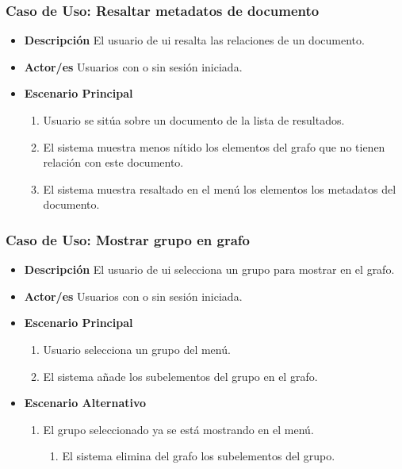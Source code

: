 \subsubsection{Caso de Uso: Resaltar \glspl{metadato} de documento}
\begin{itemize}
	\item{\textbf{Descripción}} El usuario de \gls{ui} resalta las relaciones de un documento.
    \item{\textbf{Actor/es}} Usuarios con o sin sesión iniciada.
    \item{\textbf{Escenario Principal}}
    	\begin{enumerate}
        	\item Usuario se sitúa sobre un documento de la lista de resultados.
			\item El sistema muestra menos nítido los elementos del grafo que no tienen relación con este documento.
            \item El sistema muestra resaltado en el menú los elementos los \glspl{metadato} del documento.
        \end{enumerate}
\end{itemize}


\subsubsection{Caso de Uso: Mostrar grupo en grafo}
\begin{itemize}
	\item{\textbf{Descripción}} El usuario de \gls{ui} selecciona un grupo para mostrar en el grafo.
    \item{\textbf{Actor/es}} Usuarios con o sin sesión iniciada.
    \item{\textbf{Escenario Principal}}
    	\begin{enumerate}
        	\item Usuario selecciona un grupo del menú.
			\item El sistema añade los subelementos del grupo en el grafo.
        \end{enumerate}
    \item{\textbf{Escenario Alternativo}}
    	\begin{enumerate}[label=2.\alph*]
    		\item El grupo seleccionado ya se está mostrando en el menú.
            \begin{enumerate}[label=\arabic*]
			\item El sistema elimina del grafo los subelementos del grupo.
            \end{enumerate}
        \end{enumerate}
\end{itemize}


